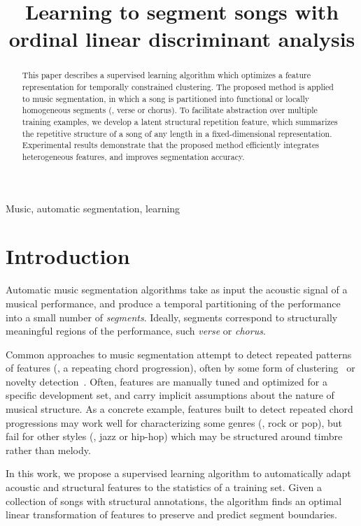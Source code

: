 \documentclass{article}
\title{Learning to segment songs with ordinal linear discriminant analysis}
\begin{document}
%
\maketitle
%
\begin{abstract}
This paper describes a supervised learning algorithm which optimizes a feature representation for temporally constrained clustering. 
The proposed method is applied to music segmentation, in which a song is partitioned into functional or
locally homogeneous segments (\eg, verse or chorus).  
To facilitate abstraction over multiple training examples, we develop a latent structural repetition feature, which summarizes the
repetitive structure of a song of any length in a fixed-dimensional representation.
Experimental results demonstrate that the proposed method efficiently integrates heterogeneous features, and improves segmentation accuracy.
\end{abstract}
%
\begin{keywords}
Music, automatic segmentation, learning
\end{keywords}
%
\section{Introduction}
\label{sec:intro}

Automatic music segmentation algorithms take as input the acoustic signal of a musical performance, and produce a temporal
partitioning of the performance into a small number of \emph{segments}.  Ideally, segments correspond to structurally
meaningful regions of the performance, such \emph{verse} or \emph{chorus}.

Common approaches to music segmentation attempt to detect repeated patterns of features (\eg, a repeating chord progression),
often by some form of clustering~\cite{levy2008structural} or novelty detection~\cite{serra2012unsupervised}.  Often, features
are manually tuned and optimized for a specific development set, and carry implicit assumptions about the nature of musical 
structure.  As a concrete example, features built to detect repeated chord progressions may work well for characterizing some 
genres (\eg, rock or pop), but fail for other styles (\eg, jazz or hip-hop) which may be structured around timbre rather than melody.

In this work, we propose a supervised learning algorithm to automatically adapt acoustic and structural features to the statistics
of a training set. Given a collection of songs with structural annotations, the algorithm finds an optimal linear transformation
of features to preserve and predict segment boundaries.
\end{document}
